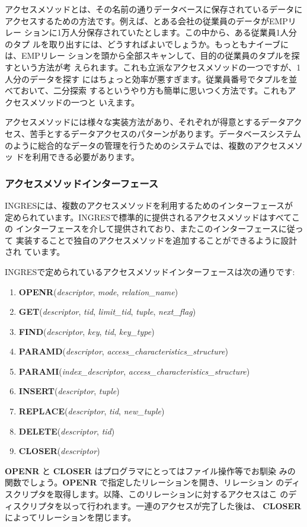 アクセスメソッドとは、その名前の通りデータベースに保存されているデータに
アクセスするための方法です。例えば、とある会社の従業員のデータがEMPリレー
ションに1万人分保存されていたとします。この中から、ある従業員1人分のタプ
ルを取り出すには、どうすればよいでしょうか。もっともナイーブには、EMPリレー
ションを頭から全部スキャンして、目的の従業員のタプルを探すという方法が考
えられます。これも立派なアクセスメソッドの一つですが、1人分のデータを探す
にはちょっと効率が悪すぎます。従業員番号でタプルを並べておいて、二分探索
するというやり方も簡単に思いつく方法です。これもアクセスメソッドの一つと
いえます。

アクセスメソッドには様々な実装方法があり、それぞれが得意とするデータアク
セス、苦手とするデータアクセスのパターンがあります。データベースシステム
のように総合的なデータの管理を行うためのシステムでは、複数のアクセスメソッ
ドを利用できる必要があります。

\subsubsection{アクセスメソッドインターフェース}

INGRESには、複数のアクセスメソッドを利用するためのインターフェースが
定められています。INGRESで標準的に提供されるアクセスメソッドはすべてこの
インターフェースを介して提供されており、またこのインターフェースに従って
実装することで独自のアクセスメソッドを追加することができるように設計され
ています。

INGRESで定められているアクセスメソッドインターフェースは次の通りです:
\begin{enumerate}
 \item {\bf OPENR}({\it descriptor}, {\it mode}, {\it relation\_name})
 \item {\bf GET}({\it descriptor}, {\it tid}, {\it limit\_tid}, {\it
       tuple}, {\it next\_flag})
 \item {\bf FIND}({\it descriptor}, {\it key}, {\it tid}, {\it key\_type})
 \item {\bf PARAMD}({\it descriptor}, {\it access\_characteristics\_structure})
 \item {\bf PARAMI}({\it index\_descriptor}, {\it access\_characteristics\_structure})
 \item {\bf INSERT}({\it descriptor}, {\it tuple})
 \item {\bf REPLACE}({\it descriptor}, {\it tid}, {\it new\_tuple})
 \item {\bf DELETE}({\it descriptor}, {\it tid})
 \item {\bf CLOSER}({\it descriptor})
\end{enumerate}
{\bf OPENR} と {\bf CLOSER} はプログラマにとってはファイル操作等でお馴染
みの関数でしょう。{\bf OPENR} で指定したリレーションを開き、リレーション
のディスクリプタを取得します。以降、このリレーションに対するアクセスはこ
のディスクリプタを以って行われます。一連のアクセスが完了した後は、{\bf
CLOSER} によってリレーションを閉じます。

